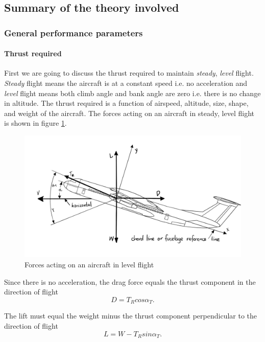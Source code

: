 \documentclass[letterpaper,12pt]{article}
\begin{document}
\subsection{Summary of the theory involved \cite{phillips}}
\subsubsection{General performance parameters}
\paragraph{Thrust required}

First we are going to discuss the thrust required to maintain \textit{steady}, \textit{level} flight. \textit{Steady} flight means the aircraft is at a constant speed i.e. no acceleration and \textit{level} flight means both climb angle and bank angle are zero i.e. there is no change in altitude. The thrust required is a function of airspeed, altitude, size, shape, and weight of the aircraft. The forces acting on an aircraft in steady, level flight is shown in figure \ref{forces-level}.

\begin{figure}[h]
\includegraphics[scale=0.4]{forces_level}
\centering
\caption{Forces acting on an aircraft in level flight}
\label{forces-level}
\end{figure}

Since there is no acceleration, the drag force equals the thrust component in the direction of flight
\begin{equation}
D=T_Rcos\alpha_T.
\end{equation}

The lift must equal the weight minus the thrust component perpendicular to the direction of flight
\begin{equation}
L=W-T_Rsin\alpha_T.
\label{lift1}
\end{equation}
\end{document}
